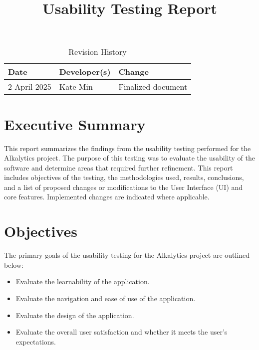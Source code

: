 \documentclass{article}
\title{Usability Testing Report\\\progname}
\author{\authname}
\date{}
\begin{document}
\maketitle

\newpage

\begin{table}[hp]
\caption{Revision History} \label{TblRevisionHistory}
\begin{tabularx}{\textwidth}{llX}
\toprule
\textbf{Date} & \textbf{Developer(s)} & \textbf{Change}\\
\midrule
2 April 2025 & Kate Min & Finalized document\\
\bottomrule
\end{tabularx}
\end{table}

\newpage

\tableofcontents

\newpage

\section{Executive Summary}
This report summarizes the findings from the usability testing performed for the
Alkalytics project. The purpose of this testing was to evaluate the usability of
the software and determine areas that required further refinement.
This report includes objectives of the testing, the methodologies used, results,
conclusions, and a list of proposed changes or modifications to the User
Interface (UI) and core features. Implemented changes are indicated where
applicable.

\section{Objectives}
The primary goals of the usability testing for the Alkalytics project are
outlined below:

\begin{itemize} 
    \item Evaluate the learnability of the application.
    \item Evaluate the navigation and ease of use of the application.
    \item Evaluate the design of the application.
    \item Evaluate the overall user satisfaction and whether it meets the user's
    expectations.
\end{itemize}
\end{document}
